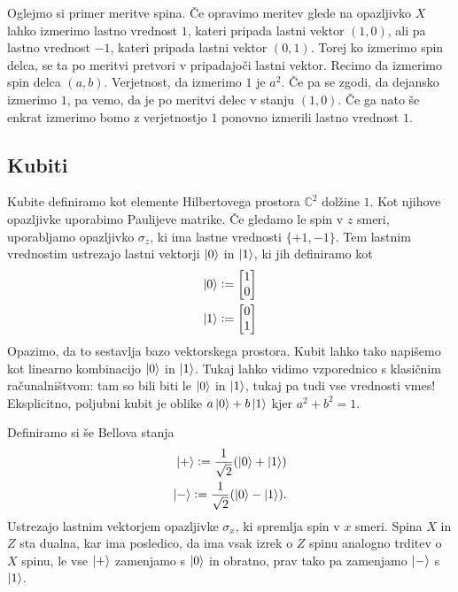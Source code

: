 \documentclass[mat1]{fmfdelo}
\newcommand{\defeq}{\vcentcolon=}
\begin{document}
Oglejmo si primer meritve spina. Če opravimo meritev glede na opazljivko \(X\) lahko izmerimo lastno vrednost \(1\), kateri pripada lastni vektor \((1,0)\), ali pa lastno vrednost \(-1\), kateri pripada lastni vektor \((0,1)\). Torej ko izmerimo spin delca, se ta po meritvi pretvori v pripadajoči lastni vektor. Recimo da izmerimo spin delca \((a,b)\). Verjetnost, da izmerimo \(1\) je \(a^2\). Če pa se zgodi, da dejansko izmerimo \(1\), pa vemo, da je po meritvi delec v stanju \((1,0)\). Če ga nato še enkrat izmerimo bomo z verjetnostjo \(1\) ponovno izmerili lastno vrednost \(1\).
\subsection{Kubiti}
Kubite definiramo kot elemente Hilbertovega prostora \(\mathbb C^2\) dolžine \(1\). Kot njihove opazljivke uporabimo Paulijeve matrike. Če gledamo le spin v \(z\) smeri, uporabljamo opazljivko \(\sigma_z\), ki ima lastne vrednosti \(\{+1, -1\}\). Tem lastnim vrednostim ustrezajo lastni vektorji \(\ket0\) in \(\ket1\), ki jih definiramo kot
\begin{align*}
    \ket0 \defeq \begin{bmatrix}
        1\\0
    \end{bmatrix}\\
    \ket1 \defeq \begin{bmatrix}
        0\\1
    \end{bmatrix}
\end{align*}
Opazimo, da to sestavlja bazo vektorskega prostora. Kubit lahko tako napišemo kot linearno kombinacijo \(\ket0\) in \(\ket1\). Tukaj lahko vidimo vzporednico s klasičnim računalništvom: tam so bili biti le \(\ket0\) in \(\ket1\), tukaj pa tudi vse vrednosti vmes! Eksplicitno, poljubni kubit je oblike \(a\ket0+b\ket1\) kjer \(a^2+b^2=1\).

Definiramo si še Bellova stanja
\begin{align*}
    \ket{+} \defeq \frac{1}{\sqrt2} (\ket0+\ket1)\\
    \ket{-} \defeq \frac{1}{\sqrt2} (\ket0-\ket1).
\end{align*}
Ustrezajo lastnim vektorjem opazljivke \(\sigma_x\), ki spremlja spin v \(x\) smeri. Spina \(X\) in \(Z\) sta dualna, kar ima posledico, da ima vsak izrek o \(Z\) spinu analogno trditev o \(X\) spinu, le vse \(\ket+\) zamenjamo s \(\ket0\) in obratno, prav tako pa zamenjamo \(\ket-\) s \(\ket1\).
\end{document}
